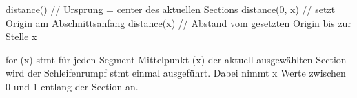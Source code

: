 distance()               // Ursprung = center des aktuellen Sections
distance(0, x)          // setzt Origin am Abschnittsanfang
distance(x)             // Abstand vom gesetzten Origin bis zur Stelle x

for (x) stmt
für jeden Segment-Mittelpunkt (x) der aktuell ausgewählten Section
wird der Schleifenrumpf stmt einmal ausgeführt.
Dabei nimmt x Werte zwischen 0 und 1 entlang der Section an.